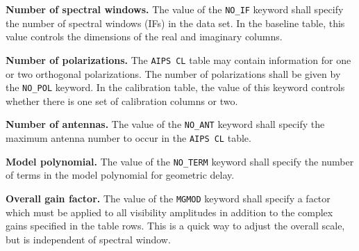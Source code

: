 \documentclass[twoside]{article}
\begin{document}
{\bf Number of spectral windows.} The value of the {\tt NO\_IF}
keyword shall specify the number of spectral windows (IFs) in the data
set.  In the baseline table, this value controls the dimensions of the
real and imaginary columns.

{\bf Number of polarizations.}  The {\tt AIPS CL} table may contain
information for one or two orthogonal polarizations.  The number of
polarizations shall be given by the {\tt NO\_POL} keyword.   In the
calibration table, the value of this keyword controls whether there is
one set of calibration columns or two.

{\bf Number of antennas.} The value of the {\tt NO\_ANT} keyword shall
specify the maximum antenna number to occur in the {\tt AIPS CL} table.

{\bf Model polynomial.} The value of the {\tt NO\_TERM} keyword shall
specify the number of terms in the model polynomial for geometric
delay.

{\bf Overall gain factor.} The value of the {\tt MGMOD} keyword shall
specify a factor which must be applied to all visibility amplitudes in
addition to the complex gains specified in the table rows.  This is a
quick way to adjust the overall scale, but is independent of spectral
window.
\end{document}
